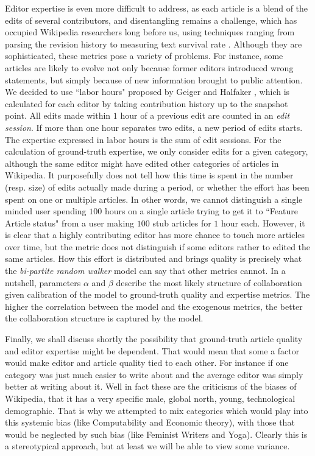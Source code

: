 Editor expertise is even more difficult to address, as each article is a blend of the edits of several contributors, and disentangling remains a challenge, which has occupied Wikipedia researchers long before us, using techniques ranging from parsing the revision history to measuring text survival rate \cite{adler2008measuringauthor}. Although they are sophisticated, these metrics pose a variety of problems. For instance, some articles are likely to evolve not only because former editors introduced wrong statements, but simply because of new information brought to public attention. We decided to use ``labor hours" proposed by Geiger and Halfaker \cite{geiger2013}, which is calculated for each editor by taking contribution history up to the snapshot point. All edits made within $1$ hour of a previous edit are counted in an {\it edit session}. If more than one hour separates two edits, a new period of edits  starts. 
 The expertise expressed in labor hours is the sum of edit sessions. For the calculation of ground-truth expertise, we only consider edits for a given category, although the same editor might have edited other categories of articles in Wikipedia. It purposefully does not tell how this time is spent in the number (resp. size) of edits actually made during a period, or whether the effort has been spent on one or multiple articles. In other words, we cannot distinguish a single minded user spending $100$ hours on a single article trying to get it to ``Feature Article status" from a user making $100$ stub articles for $1$ hour each.  However, it is clear that a highly contributing editor has more chance to touch more articles over time, but the metric does not distinguish if some editors rather to edited the same articles. How this effort is distributed and brings quality is precisely what the {\it bi-partite random walker} model can say that other metrics cannot. In a nutshell, parameters $\alpha$ and $\beta$ describe the most likely structure of collaboration given calibration of the model to ground-truth quality and expertise metrics. The higher the correlation between the model and the exogenous metrics, the better the collaboration structure is captured by the model. 

Finally, we shall discuss shortly the possibility that ground-truth article quality and editor expertise might be dependent. That would mean that some a factor would make editor and article quality tied to each other. For instance if one category was just much easier to write about and the average editor was simply better at writing about it. Well in fact these are the criticisms of the biases of Wikipedia, that it has a very specific male, global north, young, technological demographic. That is why we attempted to mix categories which would play into this systemic bias (like Computability and Economic theory), with those that would be neglected by such bias (like Feminist Writers and Yoga). Clearly this is a stereotypical approach, but at least we will be able to view some variance. 

